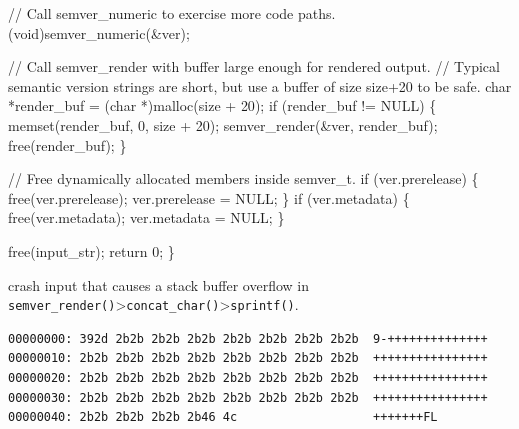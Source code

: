 \documentclass[
  a4paper,
]{scrreprt}
\newenvironment{Shaded}{\begin{snugshade}}{\end{snugshade}}
\newcommand{\CommentTok}[1]{\textcolor[rgb]{0.41,0.41,0.41}{#1}}
\newcommand{\ControlFlowTok}[1]{\textcolor[rgb]{0.85,0.12,0.09}{#1}}
\newcommand{\DataTypeTok}[1]{\textcolor[rgb]{0.47,0.16,0.63}{#1}}
\newcommand{\DecValTok}[1]{\textcolor[rgb]{0.47,0.16,0.63}{#1}}
\newcommand{\NormalTok}[1]{\textcolor[rgb]{0.33,0.33,0.33}{#1}}
\newcommand{\OperatorTok}[1]{\textcolor[rgb]{0.00,0.46,0.62}{#1}}
\theoremstyle{definition}
\theoremstyle{remark}
\begin{document}
\begin{Shaded}
\begin{Highlighting}[numbers=left,,]
    \CommentTok{// Call semver\_numeric to exercise more code paths.}
    \OperatorTok{(}\DataTypeTok{void}\OperatorTok{)}\NormalTok{semver\_numeric}\OperatorTok{(\&}\NormalTok{ver}\OperatorTok{);}

    \CommentTok{// Call semver\_render with buffer large enough for rendered output.}
    \CommentTok{// Typical semantic version strings are short, but use a buffer of size size+20 to be safe.}
    \DataTypeTok{char} \OperatorTok{*}\NormalTok{render\_buf }\OperatorTok{=} \OperatorTok{(}\DataTypeTok{char} \OperatorTok{*)}\NormalTok{malloc}\OperatorTok{(}\NormalTok{size }\OperatorTok{+} \DecValTok{20}\OperatorTok{);}
    \ControlFlowTok{if} \OperatorTok{(}\NormalTok{render\_buf }\OperatorTok{!=}\NormalTok{ NULL}\OperatorTok{)} \OperatorTok{\{}
\NormalTok{        memset}\OperatorTok{(}\NormalTok{render\_buf}\OperatorTok{,} \DecValTok{0}\OperatorTok{,}\NormalTok{ size }\OperatorTok{+} \DecValTok{20}\OperatorTok{);}
\NormalTok{        semver\_render}\OperatorTok{(\&}\NormalTok{ver}\OperatorTok{,}\NormalTok{ render\_buf}\OperatorTok{);}
\NormalTok{        free}\OperatorTok{(}\NormalTok{render\_buf}\OperatorTok{);}
    \OperatorTok{\}}

    \CommentTok{// Free dynamically allocated members inside semver\_t.}
    \ControlFlowTok{if} \OperatorTok{(}\NormalTok{ver}\OperatorTok{.}\NormalTok{prerelease}\OperatorTok{)} \OperatorTok{\{}
\NormalTok{        free}\OperatorTok{(}\NormalTok{ver}\OperatorTok{.}\NormalTok{prerelease}\OperatorTok{);}
\NormalTok{        ver}\OperatorTok{.}\NormalTok{prerelease }\OperatorTok{=}\NormalTok{ NULL}\OperatorTok{;}
    \OperatorTok{\}}
    \ControlFlowTok{if} \OperatorTok{(}\NormalTok{ver}\OperatorTok{.}\NormalTok{metadata}\OperatorTok{)} \OperatorTok{\{}
\NormalTok{        free}\OperatorTok{(}\NormalTok{ver}\OperatorTok{.}\NormalTok{metadata}\OperatorTok{);}
\NormalTok{        ver}\OperatorTok{.}\NormalTok{metadata }\OperatorTok{=}\NormalTok{ NULL}\OperatorTok{;}
    \OperatorTok{\}}

\NormalTok{    free}\OperatorTok{(}\NormalTok{input\_str}\OperatorTok{);}
    \ControlFlowTok{return} \DecValTok{0}\OperatorTok{;}
\OperatorTok{\}}
\end{Highlighting}
\end{Shaded}

crash input that causes a stack buffer overflow in
\texttt{semver\_render()}\textgreater{}\texttt{concat\_char()}\textgreater{}\texttt{sprintf()}.

\begin{verbatim}
00000000: 392d 2b2b 2b2b 2b2b 2b2b 2b2b 2b2b 2b2b  9-++++++++++++++
00000010: 2b2b 2b2b 2b2b 2b2b 2b2b 2b2b 2b2b 2b2b  ++++++++++++++++
00000020: 2b2b 2b2b 2b2b 2b2b 2b2b 2b2b 2b2b 2b2b  ++++++++++++++++
00000030: 2b2b 2b2b 2b2b 2b2b 2b2b 2b2b 2b2b 2b2b  ++++++++++++++++
00000040: 2b2b 2b2b 2b2b 2b46 4c                   +++++++FL
\end{verbatim}
\end{document}
